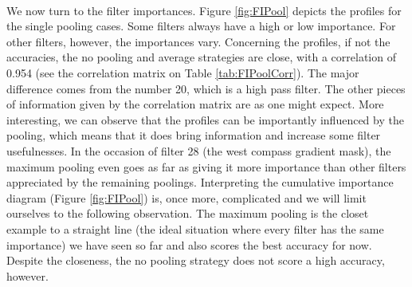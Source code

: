 \documentclass[a4paper]{report}
\begin{document}
	\paragraph{}
	We now turn to the filter importances. Figure \ref{fig:FIPool} depicts the profiles for the single pooling cases. Some filters always have a high or low importance. For other filters, however, the importances vary. Concerning the profiles, if not the accuracies, the no pooling and average strategies are close, with a correlation of 0.954 (see the correlation matrix on Table \ref{tab:FIPoolCorr}). The major difference comes from the number 20, which is a high pass filter. %
	The other pieces of information given by the correlation matrix are as one might expect.
	More interesting, we can observe that the profiles can be importantly influenced by the pooling, which means that it does bring information and increase some filter usefulnesses. In the occasion of filter 28 (the west compass gradient mask), the maximum pooling even goes as far as giving it more importance than other filters appreciated by the remaining poolings. 
	Interpreting the cumulative importance diagram (Figure \ref{fig:FIPool}) is, once more, complicated and we will limit ourselves to the following observation. The maximum pooling is the closet example to a straight line (the ideal situation where every filter has the same importance) we have seen so far and also scores the best accuracy for now. Despite the closeness, the no pooling strategy does not score a high accuracy, however.
	
\end{document}
